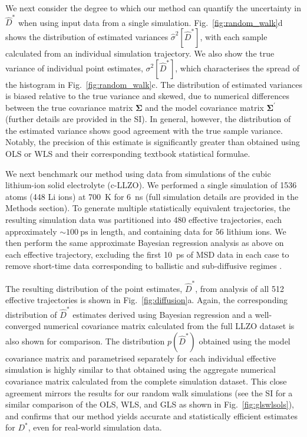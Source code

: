 \documentclass[reprint,superscriptaddress,nobibnotes,amsmath,amssymb,aps,prx,hidelinks,linenumbers]{revtex4-2}
\newcommand{\prob}[1]{\ensuremath{p(#1)}}
\newcommand{\Dest}{\ensuremath{\widehat{D}^*}}
\newcommand{\D}{\ensuremath{D^*}}
\newcommand{\var}[1]{\ensuremath{\sigma^2[#1]}}
\newcommand{\varest}[1]{\ensuremath{\widehat{\sigma}^2[#1]}}
\begin{document}
We next consider the degree to which our method can quantify the uncertainty in $\Dest$ when using input data from a single simulation.
Fig.~\ref{fig:random_walk}d shows the distribution of estimated variances $\varest{\Dest}$, with each sample calculated from an individual simulation trajectory.
We also show the true variance of individual point estimates, $\var{\Dest}$, which characterises the spread of the histogram in Fig.~\ref{fig:random_walk}c.
The distribution of estimated variances is biased relative to the true variance and skewed, due to numerical differences between the true covariance matrix $\mathbf{\Sigma}$ and the model covariance matrix $\mathbf{\Sigma^\prime}$ (further details are provided in the SI).
In general, however, the distribution of the estimated variance shows good agreement with the true sample variance.
Notably, the precision of this estimate is significantly greater than obtained using OLS or WLS and their corresponding textbook statistical formulae.

We next benchmark our method using data from simulations of the cubic lithium-ion solid electrolyte  (c-LLZO).
We performed a single simulation of \num{1536} atoms (\num{448} Li ions) at \SI{700}{K} for \SI{6}{\nano\second} (full simulation details are provided in the Methods section).
To generate multiple statistically equivalent trajectories, the resulting simulation data was partitioned into \num{480} effective trajectories, each approximately $\sim\SI{100}{\ps}$ in length, and containing data for \num{56} lithium ions.
We then perform the same approximate Bayesian regression analysis as above on each effective trajectory, excluding the first \SI{10}{ps} of MSD data in each case to remove short-time data corresponding to ballistic and sub-diffusive regimes \cite{he_statistical_2018}.

The resulting distribution of the point estimates, $\Dest$, from analysis of all \num{512} effective trajectories is shown in Fig.~\ref{fig:diffusion}a.
Again, the corresponding distribution of $\Dest$ estimates derived using Bayesian regression and a well-converged numerical covariance matrix calculated from the full LLZO dataset is also shown for comparison.
The distribution $\prob{\Dest}$ obtained using the model covariance matrix and parametrised separately for each individual effective simulation is highly similar to that obtained using the aggregate numerical covariance matrix calculated from the complete simulation dataset.
This close agreement mirrors the results for our random walk simulations (see the SI for a similar comparison of the OLS, WLS, and GLS as shown in Fig.~\ref{fig:glswlsols}), and confirms that our method yields accurate and statistically efficient estimates for $\D$, even for real-world simulation data.
\end{document}
